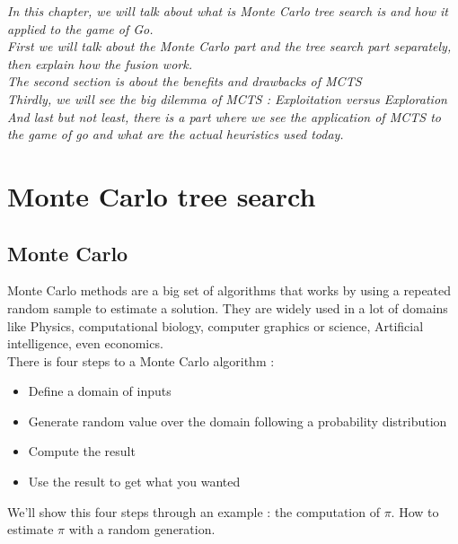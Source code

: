 
\textit{In this chapter, we will talk about what is Monte Carlo tree search is and how it applied to the game of Go.}
\\

\textit{First we will talk about the Monte Carlo part and the tree search part separately, then explain how the fusion work.}
\\

\textit{The second section is about the benefits and drawbacks of MCTS}
\\

\textit{Thirdly, we will see the big dilemma of MCTS : Exploitation versus Exploration}
\\

\textit{And last but not least, there is a part where we see the application of MCTS to the game of go and what are the actual heuristics used today. }

\section{Monte Carlo tree search}

\subsection{Monte Carlo}

Monte Carlo methods are a big set of algorithms that works by using a repeated random sample to estimate a solution. They are widely used in a lot of domains like Physics, computational biology, computer graphics or science, Artificial intelligence, even economics. 
\\

There is four steps to a Monte Carlo algorithm : 

\begin{itemize}
\item Define a domain of inputs
\item Generate random value over the domain following a probability distribution
\item Compute the result
\item Use the result to get what you wanted
\end{itemize} 

We'll show this four steps through an example : the computation of $\pi$. How to estimate $\pi$ with a random generation. 

